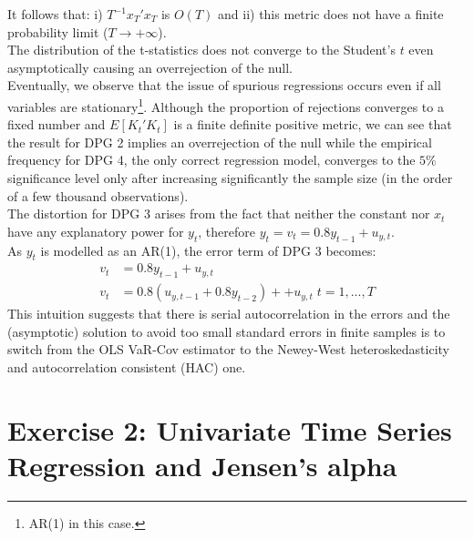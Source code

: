 \documentclass[12pt]{article}
\begin{document}
	It follows that: i) $T^{-1}x_{T}'x_{T}$ is $O(T)$ and ii) this metric does not have a finite probability limit ($T \to + \infty$). \\
	The distribution of the t-statistics does not converge to the Student's $t$ even asymptotically causing an overrejection of the null.\\
	Eventually, we observe that the issue of spurious regressions occurs even if all variables are stationary\footnote{AR(1) in this case.}.
	Although the proportion of rejections converges to a fixed number and $E[K_{t}'K_{t}]$ is a finite definite positive metric, we can see that the result for DPG 2 implies an overrejection of the null while the empirical frequency for DPG 4, the only correct regression model, converges to the $5\%$ significance level only after increasing significantly the sample size (in the order of a few thousand observations). \\  
	The distortion for DPG 3 arises from the fact that neither the constant nor $x_t$ have any explanatory power for $y_t$, therefore $y_t = v_t = 0.8y_{t-1}+u_{y,t}$.\\ As $y_t$ is modelled as an AR(1), the error term of DPG 3 becomes:
	\begin{align*}
	v_t &= 0.8y_{t-1}+u_{y,t} \\
	v_t &= 0.8(u_{y,t-1} + 0.8y_{t-2}) + +u_{y,t} \; t=1,...,T
	\end{align*}
	This intuition suggests that there is serial autocorrelation in the errors and the (asymptotic) solution to avoid too small standard errors in finite samples is to switch from the OLS VaR-Cov estimator to the Newey-West heteroskedasticity and autocorrelation consistent (HAC) one.
\section{Exercise 2: Univariate Time Series Regression and Jensen's alpha}
\end{document}
